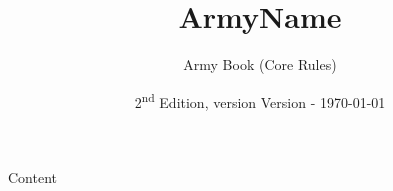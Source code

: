 \documentclass[12pt]{article}
\begin{document}
\title{ {{ArmyName}} }
\author{Army Book (Core Rules)}
\date{2\textsuperscript{nd} Edition, version \the\year{} {{Version}} - \today}

{{Content}}
\end{document}
